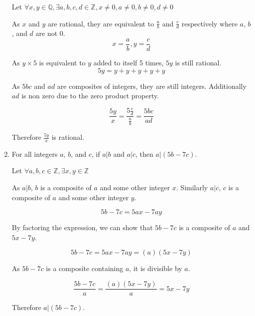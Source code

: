 \documentclass[12pt,letterpaper,titlepage]{article}
\begin{document}
\begin{raggedright}
\begin{enumerate}
Let $\forall x, y \in\mathbb{Q}, 
	 \exists a,b,c,d \in \mathbb{Z}, 
	 x \neq 0, 
	 a \neq 0, 
	 b \neq 0, 
	 d \neq 0$

As $x$ and $y$ are rational, they are equivalent to $\frac{a}{b}$ and $\frac{c}{d}$ respectively where $a$, $b$, and $d$ are not 0.
\begin{equation}
x = \frac{a}{b}, y = \frac{c}{d}
\end{equation}

As $y\times 5$ is equivalent to $y$ added to itself 5 times, $5y$ is still rational.
\begin{equation}
5y = y + y + y + y + y
\end{equation}

As $5bc$ and $ad$ are composites of integers, they are still integers. Additionally $ad$ is non zero due to the zero product property.

\begin{equation}
\frac{5y}{x} = \frac{5\frac{c}{d}}{\frac{a}{b}} = \frac{5bc}{ad}
\end{equation}

Therefore $\frac{5y}{x}$ is rational.

\pagebreak


\item For all integers $a$, $b$, and $c$, if $a | b$ and $a | c$, then $a | (5b − 7c)$.

Let $\forall a, b, c \in \mathbb{Z}, \exists x, y \in \mathbb{Z}$

As $a | b$, $b$ is a composite of $a$ and some other integer $x$. Similarly $a | c$, $c$ is a composite of $a$ and some other integer $y$.

\begin{equation}
5b - 7c = 5ax - 7ay
\end{equation}

By factoring the expression, we can show that $5b-7c$ is a composite of $a$ and $5x-7y$.

\begin{equation}
5b - 7c = 5ax - 7ay = (a)(5x-7y)
\end{equation}

As $5b-7c$ is a composite containing $a$, it is divisible by $a$.

\begin{equation}
\frac{5b-7c}{a} = \frac{(a)(5x-7y)}{a} = 5x-7y
\end{equation}

Therefore $a|(5b-7c)$.






\end{enumerate}
\end{raggedright}
\end{document}
